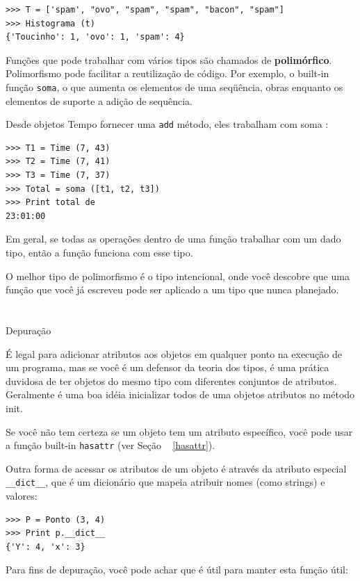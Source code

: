\documentclass[10pt]{book}
\begin{document}
\begin{v erbatim}
\begin{verbatim}
>>> T = ['spam', "ovo", "spam", "spam", "bacon", "spam"]
>>> Histograma (t)
{'Toucinho': 1, 'ovo': 1, 'spam': 4}
\end{verbatim}
%
Funções que pode trabalhar com vários tipos são chamados de {\bf polimórfico}.
Polimorfismo pode facilitar a reutilização de código. Por exemplo, o built-in
função {\tt soma}, o que aumenta os elementos de uma seqüência, obras
enquanto os elementos de suporte a adição de sequência.

Desde objetos Tempo fornecer uma {\tt add} método, eles trabalham
com {soma \tt}:

\begin{verbatim}
>>> T1 = Time (7, 43)
>>> T2 = Time (7, 41)
>>> T3 = Time (7, 37)
>>> Total = soma ([t1, t2, t3])
>>> Print total de
23:01:00
\end{verbatim}
%
Em geral, se todas as operações dentro de uma função 
trabalhar com um dado tipo, então a função funciona com esse tipo.

O melhor tipo de polimorfismo é o tipo intencional, onde
você descobre que uma função que você já escreveu pode ser
aplicado a um tipo que nunca planejado.


\section{} Depuração

É legal para adicionar atributos aos objetos em qualquer ponto na execução
de um programa, mas se você é um defensor da teoria dos tipos, é uma
prática duvidosa de ter objetos do mesmo tipo com diferentes
conjuntos de atributos. Geralmente é uma boa idéia
inicializar todos de uma objetos atributos no método init.

Se você não tem certeza se um objeto tem um atributo específico, você
pode usar a função built-in {\tt hasattr} (ver Seção ~ \ref {hasattr}).

Outra forma de acessar os atributos de um objeto é através da
atributo especial \verb "__dict__", que é um dicionário que mapeia
atribuir nomes (como strings) e valores:

\begin{verbatim}
>>> P = Ponto (3, 4)
>>> Print p.__dict__
{'Y': 4, 'x': 3}
\end{verbatim}
%
Para fins de depuração, você pode achar que é útil para manter esta
função útil:


\end{v erbatim}
\end{document}
